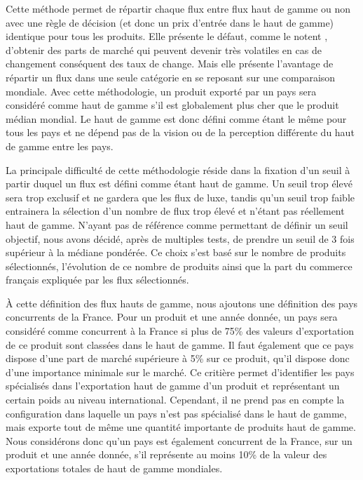 \documentclass[french,10pt,a4paper]{article}
\begin{document}
Cette méthode permet de répartir chaque flux entre flux haut de gamme ou non avec une règle de décision (et donc un prix d'entrée dans le haut de gamme) identique pour tous les produits. Elle présente le défaut, comme le notent \cite{Martin2015}, d'obtenir des parts de marché qui peuvent devenir très volatiles en cas de changement conséquent des taux de change. Mais elle présente l'avantage de répartir un flux dans une seule catégorie en se reposant sur une comparaison mondiale. Avec cette méthodologie, un produit exporté par un pays sera considéré comme haut de gamme s'il est globalement plus cher que le produit médian mondial. Le haut de gamme est donc défini comme étant le même pour tous les pays et ne dépend pas de la vision ou de la perception différente du haut de gamme entre les pays.

La principale difficulté de cette méthodologie réside dans la fixation d'un seuil à partir duquel un flux est défini comme étant haut de gamme. Un seuil trop élevé sera trop exclusif et ne gardera que les flux de luxe, tandis qu'un seuil trop faible entrainera la sélection d'un nombre de flux trop élevé et n'étant pas réellement haut de gamme. N'ayant pas de référence comme \cite{Martin2015} permettant de définir un seuil \og objectif\fg{}, nous avons décidé, après de multiples tests, de prendre un seuil de 3 fois supérieur à la médiane pondérée. Ce choix s'est basé sur le nombre de produits sélectionnés, l'évolution de ce nombre de produits ainsi que la part du commerce français expliquée par les flux sélectionnés.

\medskip

À cette définition des flux hauts de gamme, nous ajoutons une définition des pays concurrents de la France. Pour un produit et une année donnée, un pays sera considéré comme concurrent à la France si plus de 75\% des valeurs d'exportation de ce produit sont classées dans le haut de gamme. Il faut également que ce pays dispose d'une part de marché supérieure à 5\% sur ce produit, qu'il dispose donc d'une importance minimale sur le marché. Ce critière permet d'identifier les pays spécialisés dans l'exportation haut de gamme d'un produit et représentant un certain poids au niveau international. Cependant, il ne prend pas en compte la configuration dans laquelle un pays n'est pas spécialisé dans le haut de gamme, mais exporte tout de même une quantité importante de produits haut de gamme. Nous considérons donc qu'un pays est également concurrent de la France, sur un produit et une année donnée, s'il représente au moins 10\% de la valeur des exportations totales de haut de gamme mondiales.
\end{document}
